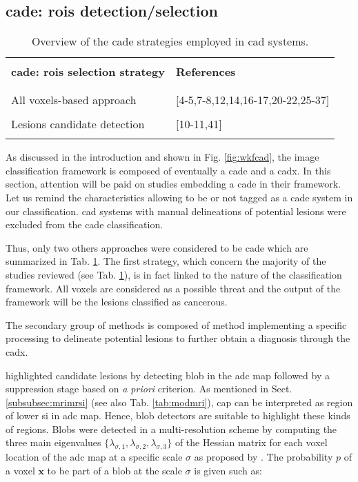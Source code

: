 \subsection{\ac{cade}: \acp{roi} detection/selection}

\begin{table}
	\caption{Overview of the \ac{cade} strategies employed in \ac{cad} systems.}
	\small
	\begin{tabular}{p{.65\linewidth} p{.25\linewidth}}
		\hline \\ [-1.5ex]
		\textbf{\ac{cade}: \acp{roi} selection strategy} & \textbf{References} \\ \\ [-1.5ex]
		\hline \\ [-1.5ex]
		\quad All voxels-based approach & $[$4-5,7-8,12,14,16-17,20-22,25-37$]$ \\ \\ [-1.5ex]
		\quad Lesions candidate detection & $[$10-11,41$]$ \\ \\ [-1.5ex]
		\hline
	\end{tabular}
	\label{tab:cade}
\end{table}

As discussed in the introduction and shown in Fig. \ref{fig:wkfcad}, the image classification framework is composed of eventually a \ac{cade} and a \ac{cadx}. In this section, attention will be paid on studies embedding a \ac{cade} in their framework. Let us remind the characteristics allowing to be or not tagged as a \ac{cade} system in our classification. \ac{cad} systems with manual delineations of potential lesions were excluded from the \ac{cade} classification.

Thus, only two others approaches were considered to be \ac{cade} which are summarized in Tab. \ref{tab:cade}. The first strategy, which concern the majority of the studies reviewed (see Tab. \ref{tab:cade}), is in fact linked to the nature of the classification framework. All voxels are considered as a possible threat and the output of the framework will be the lesions classified as cancerous.

The secondary group of methods is composed of method implementing a specific processing to delineate potential lesions to further obtain a diagnosis through the \ac{cadx}.

\cite{Vos2012} highlighted candidate lesions by detecting blob in the \ac{adc} map followed by a suppression stage based on \textit{a priori} criterion. As mentioned in Sect. \ref{subsubsec:mrimrsi} (see also Tab. \ref{tab:modmri}), \ac{cap} can be interpreted as region of lower \ac{si} in \ac{adc} map. Hence, blob detectors are suitable to highlight these kinds of regions. Blobs were detected in a multi-resolution scheme by computing the three main eigenvalues $\{ \lambda_{\sigma,1},\lambda_{\sigma,2},\lambda_{\sigma,3} \}$ of the Hessian matrix for each voxel location of the \ac{adc} map at a specific scale $\sigma$ as proposed by \cite{Li2003}. The probability $p$ of a voxel $\mathbf{x}$ to be part of a blob at the scale $\sigma$ is given such as:

